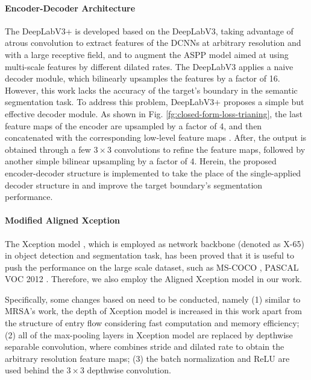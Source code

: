 \documentclass[journal]{IEEEtran}
\begin{document}
\paragraph{Encoder-Decoder Architecture}
The DeepLabV3+ is developed based on the DeepLabV3, taking advantage of atrous convolution to extract features of the DCNNs at arbitrary resolution and with a large receptive field, and to augment the ASPP model aimed at using multi-scale features by different dilated rates. The DeepLabV3 applies a naive decoder module, which bilinearly upsamples the features by a factor of 16. However, this work lacks the accuracy of the target's boundary in the semantic segmentation task. To address this problem, DeepLabV3+ proposes a simple but effective decoder module. As shown in Fig. \ref{fg:closed-form-loss-trianing}, the last feature maps of the encoder are upsampled by a factor of 4, and then concatenated with the corresponding low-level feature maps \cite{hariharan2015hypercolumns}. After, the output is obtained through a few $3\times 3$ convolutions to refine the feature maps, followed by another simple bilinear upsampling by a factor of 4. Herein, the proposed encoder-decoder structure is implemented to take the place of the single-applied decoder structure in \cite{chen2017rethinking} and improve the target boundary's segmentation performance. 

\paragraph{Modified Aligned Xception}
The Xception model \cite{chollet2017xception}, which is employed as network backbone (denoted as X-65) in object detection \cite{qi2017deformable} and segmentation \cite{chen2018encoder} task, has been proved that it is useful to push the performance on the large scale dataset, such as MS-COCO \cite{lin2014microsoft}, PASCAL VOC 2012 \cite{everingham2012pascal}. Therefore, we also employ the Aligned Xception model in our work. 

Specifically, some changes based on \cite{qi2017deformable} need to be conducted, namely (1) similar to MRSA's work, the depth of Xception model is increased in this work apart from the structure of entry flow considering fast computation and memory efficiency; (2) all of the max-pooling layers in Xception model are replaced by depthwise separable convolution, where combines stride and dilated rate to obtain the arbitrary resolution feature maps; (3) the batch normalization and ReLU are used behind the $3\times 3$ depthwise convolution. 
\end{document}
